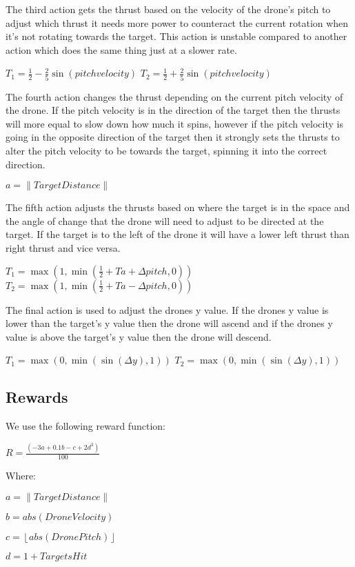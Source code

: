 \endgroup

The third action gets the thrust based on the velocity of the drone's pitch to adjust which thrust it needs more power to counteract the current rotation when it’s not rotating towards the target. This action is unstable compared to another action which does the same thing just at a slower rate.

\begingroup\centering

$T_1 = \frac{1}{2} - \frac{2}{5} \sin (pitchvelocity)$
$T_2 = \frac{1}{2} + \frac{2}{5} \sin (pitchvelocity)$

\endgroup

The fourth action changes the thrust depending on the current pitch velocity of the drone. If the pitch velocity is in the direction of the target then the thrusts will more equal to slow down how much it spins, however if the pitch velocity is going in the opposite direction of the target then it strongly sets the thrusts to alter the pitch velocity to be towards the target, spinning it into the correct direction.

\begingroup\centering
$a=\left \| Target Distance \right \|$

\endgroup

The fifth action adjusts the thrusts based on where the target is in the space and the angle of change that the drone will need to adjust to be directed at the target. If the target is to the left of the drone it will have a lower left thrust than right thrust and vice versa. 

\begingroup\centering
$T_1 = \max (1,\min (\frac{1}{2}+Ta+\Delta pitch,0))$
$T_2 = \max (1,\min (\frac{1}{2}+Ta-\Delta pitch,0))$

\endgroup

The final action is used to adjust the drones y value. If the drones y value is lower than the target's y value then the drone will ascend and if the drones y value is above the target's y value then the drone will descend. 

\begingroup\centering
$T_1 =  \max (0,\min (\sin(\Delta y),1))$
$T_2 =  \max (0,\min (\sin(\Delta y),1))$

\endgroup

\subsection{Rewards}
We use the following reward function:

\begingroup\centering

$R=\frac{(-3a+0.1b-c+2d^3)}{100}$

\endgroup

Where:

\begingroup\centering
$a=\left \| Target Distance \right \|$

$b=abs(Drone Velocity)$

$c= \left \lfloor abs(DronePitch)  \right \rfloor $

$d=1+TargetsHit$

\endgroup
